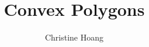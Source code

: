 \documentclass{article}
\title{Convex Polygons}
\author{Christine Hoang}
\begin{document}
\maketitle

\section{}
\end{document}
